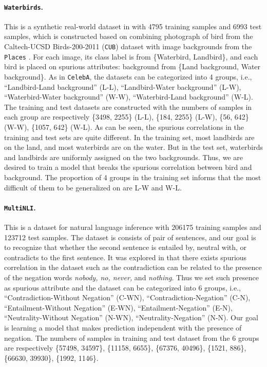 \paragraph{\texttt{Waterbirds}.} This is a synthetic real-world dataset in \citep{sagawa2019distributionally} with 4795 training samples and 6993 test samples, which is constructed based on combining photograph of bird from the Caltech-UCSD Birds-200-2011 (\texttt{CUB}) dataset \citep{wah2011caltech} with image backgrounds from the \texttt{Places} \citep{zhou2017places}. For each image, its class label is from \{Waterbird, Landbird\}, and each bird is placed on spurious attributes: background from \{Land background, Water background\}. As in \texttt{CelebA}, the datasets can be categorized into 4 groups, i.e., ``Landbird-Land background'' (L-L), ``Landbird-Water background'' (L-W), ``Waterbird-Water background'' (W-W), ``Waterbird-Land background'' (W-L). The training and test datasets are constructed with the numbers of samples in each group are respectively \{3498, 2255\} (L-L), \{184, 2255\} (L-W), \{56, 642\} (W-W), \{1057, 642\} (W-L). As can be seen, the spurious correlations in the training and test sets are quite different. In the training set, most landbirds are on the land, and most waterbirds are on the water. But in the test set, waterbirds and landbirds are uniformly assigned on the two backgrounds. Thus, we are desired to train a model that breaks the spurious correlation between bird and background. The proportion of 4 groups in the training set informs that the most difficult of them to be generalized on are L-W and W-L.  
\paragraph{\texttt{MultiNLI}.} This is a dataset for natural language inference \citep{williams2018broad} with 206175 training samples and 123712 test samples. The dataset is consists of pair of sentences, and our goal is to recognize that whether the second sentence is entailed by, neutral with, or contradicts to the first sentence. It was explored in \cite{gururangan2018annotation} that there exists spurious correlation in the dataset such as the contradiction can be related to the presence of the negation words \emph{nobody, no, never,} and \emph{nothing}. Thus we set such presence as spurious attribute and the dataset can be categorized into 6 groups, i.e., ``Contradiction-Without Negation'' (C-WN), ``Contradiction-Negation'' (C-N), ``Entailment-Without Negation'' (E-WN), ``Entailment-Negation'' (E-N), ``Neutrality-Without Negation'' (N-WN), ``Neutrality-Negation'' (N-N). Our goal is learning a model that makes prediction independent with the presence of negation. The numbers of samples in training and test dataset from the 6 groups are respectively \{57498, 34597\}, \{11158, 6655\}, \{67376, 40496\}, \{1521, 886\}, \{66630, 39930\}, \{1992, 1146\}.   
